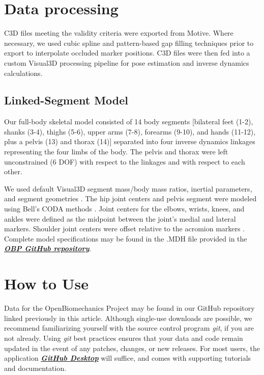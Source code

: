 \documentclass[
]{article}
\begin{document}
\hypertarget{data-processing}{%
\section{Data processing}\label{data-processing}}

C3D files meeting the validity criteria were exported from Motive. Where necessary, we used cubic spline and pattern-based gap filling techniques prior to export to interpolate occluded marker positions. C3D files were then fed into a custom Visual3D processing pipeline for pose estimation and inverse dynamics calculations.

\hypertarget{linked-segment-model}{%
\subsection{Linked-Segment Model}\label{linked-segment-model}}

Our full-body skeletal model consisted of 14 body segments {[}bilateral feet (1-2), shanks (3-4), thighs (5-6), upper arms (7-8), forearms (9-10), and hands (11-12), plus a pelvis (13) and thorax (14){]} separated into four inverse dynamics linkages representing the four limbs of the body. The pelvis and thorax were left unconstrained (6 DOF) with respect to the linkages and with respect to each other.

We used default Visual3D segment mass/body mass ratios, inertial parameters, and segment geometries \cite{dempster1955space, hanavan1964mathematical}. The hip joint centers and pelvis segment were modeled using Bell's CODA methods \cite{bell1989prediction, bell1990comparison}. Joint centers for the elbows, wrists, knees, and ankles were defined as the midpoint between the joint's medial and lateral markers. Shoulder joint centers were offset relative to the acromion markers \cite{schmidt1999marker}. Complete model specifications may be found in the .MDH file provided in the \href{https://github.com/drivelineresearch/openbiomechanics/tree/main/baseball_pitching/code/v3d/model}{\textbf{\textit{OBP GitHub repository}}}.

\hypertarget{how-to-use}{%
\section{How to Use}\label{how-to-use}}

Data for the OpenBiomechanics Project may be found in our GitHub repository linked previously in this article. Although single-use downloads are possible, we recommend familiarizing yourself with the source control program \textit{git}, if you are not already. Using \textit{git} best practices ensures that your data and code remain updated in the event of any patches, changes, or new releases. For most users, the application \href{https://desktop.github.com/}{\textit{\textbf{GitHub Desktop}}} will suffice, and comes with supporting tutorials and documentation.
\end{document}
